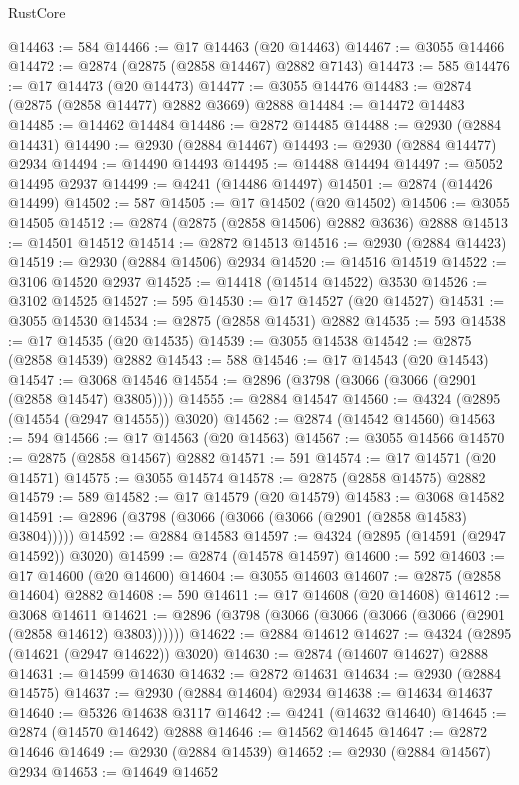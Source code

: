 \begin{lexlean}{RustCore}
\begin{coremodule}
@14463 := 584
@14466 := @17 @14463 (@20 @14463)
@14467 := @3055 @14466
@14472 := @2874 (@2875 (@2858 @14467) @2882 @7143)
@14473 := 585
@14476 := @17 @14473 (@20 @14473)
@14477 := @3055 @14476
@14483 := @2874 (@2875 (@2858 @14477) @2882 @3669) @2888
@14484 := @14472 @14483
@14485 := @14462 @14484
@14486 := @2872 @14485
@14488 := @2930 (@2884 @14431)
@14490 := @2930 (@2884 @14467)
@14493 := @2930 (@2884 @14477) @2934
@14494 := @14490 @14493
@14495 := @14488 @14494
@14497 := @5052 @14495 @2937
@14499 := @4241 (@14486 @14497)
@14501 := @2874 (@14426 @14499)
@14502 := 587
@14505 := @17 @14502 (@20 @14502)
@14506 := @3055 @14505
@14512 := @2874 (@2875 (@2858 @14506) @2882 @3636) @2888
@14513 := @14501 @14512
@14514 := @2872 @14513
@14516 := @2930 (@2884 @14423)
@14519 := @2930 (@2884 @14506) @2934
@14520 := @14516 @14519
@14522 := @3106 @14520 @2937
@14525 := @14418 (@14514 @14522) @3530
@14526 := @3102 @14525
@14527 := 595
@14530 := @17 @14527 (@20 @14527)
@14531 := @3055 @14530
@14534 := @2875 (@2858 @14531) @2882
@14535 := 593
@14538 := @17 @14535 (@20 @14535)
@14539 := @3055 @14538
@14542 := @2875 (@2858 @14539) @2882
@14543 := 588
@14546 := @17 @14543 (@20 @14543)
@14547 := @3068 @14546
@14554 := @2896 (@3798 (@3066 (@3066 (@2901 (@2858 @14547) @3805))))
@14555 := @2884 @14547
@14560 := @4324 (@2895 (@14554 (@2947 @14555)) @3020)
@14562 := @2874 (@14542 @14560)
@14563 := 594
@14566 := @17 @14563 (@20 @14563)
@14567 := @3055 @14566
@14570 := @2875 (@2858 @14567) @2882
@14571 := 591
@14574 := @17 @14571 (@20 @14571)
@14575 := @3055 @14574
@14578 := @2875 (@2858 @14575) @2882
@14579 := 589
@14582 := @17 @14579 (@20 @14579)
@14583 := @3068 @14582
@14591 := @2896 (@3798 (@3066 (@3066 (@3066 (@2901 (@2858 @14583) @3804)))))
@14592 := @2884 @14583
@14597 := @4324 (@2895 (@14591 (@2947 @14592)) @3020)
@14599 := @2874 (@14578 @14597)
@14600 := 592
@14603 := @17 @14600 (@20 @14600)
@14604 := @3055 @14603
@14607 := @2875 (@2858 @14604) @2882
@14608 := 590
@14611 := @17 @14608 (@20 @14608)
@14612 := @3068 @14611
@14621 := @2896 (@3798 (@3066 (@3066 (@3066 (@3066 (@2901 (@2858 @14612) @3803))))))
@14622 := @2884 @14612
@14627 := @4324 (@2895 (@14621 (@2947 @14622)) @3020)
@14630 := @2874 (@14607 @14627) @2888
@14631 := @14599 @14630
@14632 := @2872 @14631
@14634 := @2930 (@2884 @14575)
@14637 := @2930 (@2884 @14604) @2934
@14638 := @14634 @14637
@14640 := @5326 @14638 @3117
@14642 := @4241 (@14632 @14640)
@14645 := @2874 (@14570 @14642) @2888
@14646 := @14562 @14645
@14647 := @2872 @14646
@14649 := @2930 (@2884 @14539)
@14652 := @2930 (@2884 @14567) @2934
@14653 := @14649 @14652

\end{coremodule}
\end{lexlean}
